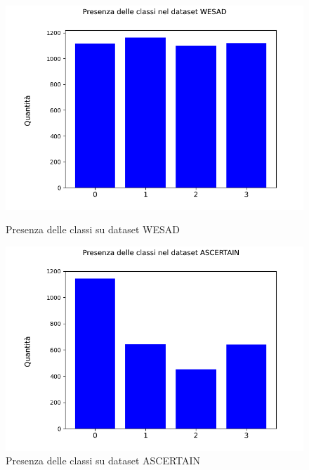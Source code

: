 \begin{figure}[h]
    \begin{minipage}[b]{0.5\textwidth}
		\includegraphics[width=\textwidth]{img/graphs/wesad_dataset.png}
		\caption{Presenza delle classi su dataset WESAD}
		\label{fig:wesadclasses}
	\end{minipage}
    \hfill
    \begin{minipage}[b]{0.5\textwidth}
		\includegraphics[width=\textwidth]{img/graphs/ascertain_dataset.png}
		\caption{Presenza delle classi su dataset ASCERTAIN}
		\label{fig:ascertainclasses}
	\end{minipage}
\end{figure}